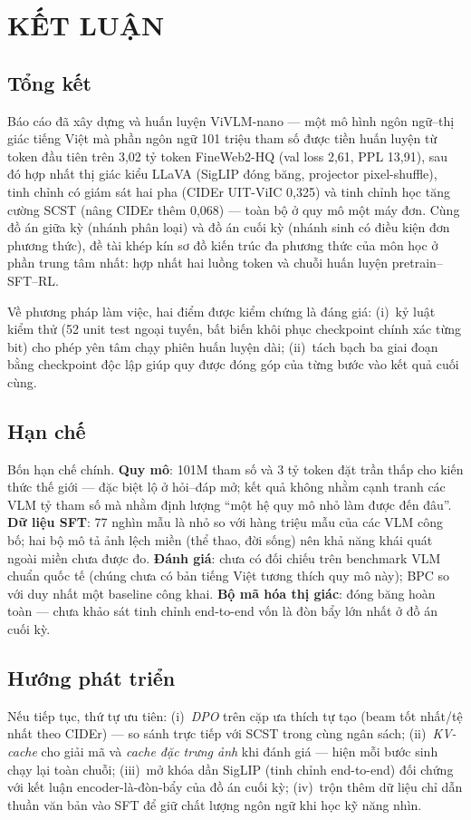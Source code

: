 \chapter{KẾT LUẬN}
\label{chap:conclusion}

\section{Tổng kết}

Báo cáo đã xây dựng và huấn luyện ViVLM-nano --- một mô hình ngôn ngữ--thị
giác tiếng Việt mà phần ngôn ngữ 101 triệu tham số được tiền huấn luyện từ
token đầu tiên trên 3,02 tỷ token FineWeb2-HQ (val loss 2,61, PPL 13,91), sau
đó hợp nhất thị giác kiểu LLaVA (SigLIP đóng băng, projector pixel-shuffle),
tinh chỉnh có giám sát hai pha (CIDEr UIT-ViIC 0,325) và tinh chỉnh học tăng
cường SCST (nâng CIDEr thêm 0,068) --- toàn bộ ở quy mô một máy đơn. Cùng đồ
án giữa kỳ (nhánh phân loại) và đồ án cuối kỳ
(nhánh sinh có điều kiện đơn phương thức), đề tài khép kín sơ đồ kiến trúc đa
phương thức của môn học ở phần trung tâm nhất: hợp nhất hai luồng token và
chuỗi huấn luyện pretrain--SFT--RL.

Về phương pháp làm việc, hai điểm được kiểm chứng là đáng giá: (i)~kỷ luật
kiểm thử (52 unit test ngoại tuyến, bất biến khôi phục checkpoint chính xác
từng bit) cho phép yên tâm chạy phiên huấn luyện dài; (ii)~tách bạch ba giai
đoạn bằng checkpoint độc lập giúp quy được đóng góp của từng bước vào kết quả
cuối cùng.

\section{Hạn chế}

Bốn hạn chế chính. \textbf{Quy mô}: 101M tham số và 3 tỷ token đặt trần thấp
cho kiến thức thế giới --- đặc biệt lộ ở hỏi--đáp mở; kết quả không nhằm cạnh
tranh các VLM tỷ tham số mà nhằm định lượng ``một hệ quy mô nhỏ làm được đến đâu''.
\textbf{Dữ liệu SFT}: 77 nghìn mẫu là nhỏ so với hàng triệu mẫu của các VLM
công bố; hai bộ mô tả ảnh lệch miền (thể thao, đời sống) nên khả năng khái
quát ngoài miền chưa được đo. \textbf{Đánh giá}: chưa có đối chiếu trên
benchmark VLM chuẩn quốc tế (chúng chưa có bản tiếng Việt tương thích quy mô
này); BPC so với duy nhất một baseline công khai. \textbf{Bộ mã hóa thị
giác}: đóng băng hoàn toàn --- chưa khảo sát tinh chỉnh end-to-end vốn là đòn
bẩy lớn nhất ở đồ án cuối kỳ.

\section{Hướng phát triển}

Nếu tiếp tục, thứ tự ưu tiên: (i)~\emph{DPO} trên cặp ưa thích tự tạo (beam
tốt nhất/tệ nhất theo CIDEr) --- so sánh trực tiếp với SCST trong cùng ngân
sách; (ii)~\emph{KV-cache} cho giải mã và \emph{cache đặc trưng ảnh} khi đánh
giá --- hiện mỗi bước sinh chạy lại toàn chuỗi; (iii)~mở khóa dần SigLIP
(tinh chỉnh end-to-end) đối chứng với kết luận encoder-là-đòn-bẩy của đồ án
cuối kỳ; (iv)~trộn thêm dữ liệu chỉ dẫn thuần văn bản vào SFT để giữ chất
lượng ngôn ngữ khi học kỹ năng nhìn.
